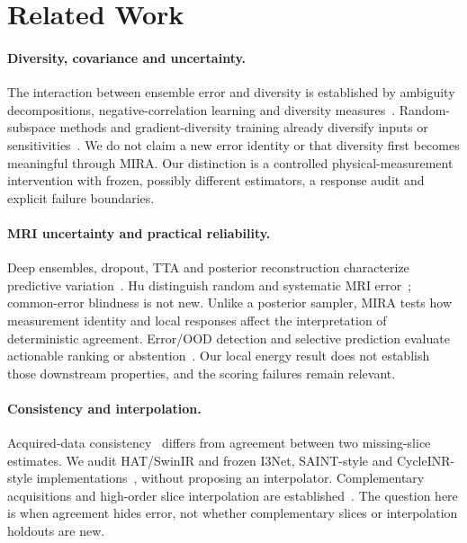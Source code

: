 \documentclass[10pt,twocolumn,letterpaper]{article}
\begin{document}
\section{Related Work}
\paragraph{Diversity, covariance and uncertainty.}
The interaction between ensemble error and diversity is established by ambiguity decompositions, negative-correlation learning and diversity measures~\cite{krogh1994ensembles,liu1999negative,kuncheva2003diversity,brown2005diversity,ortega2022diversity}. Random-subspace methods and gradient-diversity training already diversify inputs or sensitivities~\cite{ho1998subspace,kariyappa2019diversity}. We do not claim a new error identity or that diversity first becomes meaningful through MIRA. Our distinction is a controlled physical-measurement intervention with frozen, possibly different estimators, a response audit and explicit failure boundaries.

\paragraph{MRI uncertainty and practical reliability.}
Deep ensembles, dropout, TTA and posterior reconstruction characterize predictive variation~\cite{lakshminarayanan2017ensembles,gal2016dropout,wang2019tta,edupuganti2021uncertainty,narnhofer2022bayesian,luo2023diffusion}. Hu \etal distinguish random and systematic MRI error~\cite{hu2021predict}; common-error blindness is not new. Unlike a posterior sampler, MIRA tests how measurement identity and local responses affect the interpretation of deterministic agreement. Error/OOD detection and selective prediction evaluate actionable ranking or abstention~\cite{hendrycks2017baseline,geifman2017selective}. Our local energy result does not establish those downstream properties, and the scoring failures remain relevant.

\paragraph{Consistency and interpolation.}
Acquired-data consistency~\cite{lustig2010spirit} differs from agreement between two missing-slice estimates. We audit HAT/SwinIR and frozen I3Net, SAINT-style and CycleINR-style implementations~\cite{chen2023hat,liang2021swinir,song2024i3net,peng2020saint,fang2024cycleinr}, without proposing an interpolator. Complementary acquisitions and high-order slice interpolation are established~\cite{greenspan2002interslice,nicastro2022shift,horvath2017highorder}. The question here is when agreement hides error, not whether complementary slices or interpolation holdouts are new.
\end{document}
